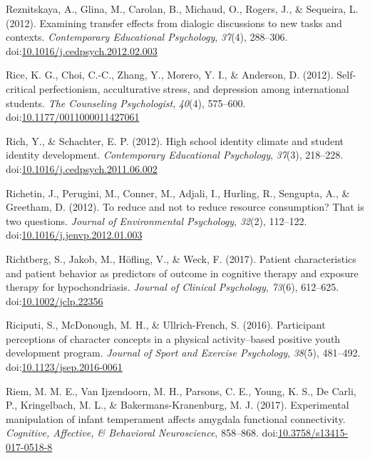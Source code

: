 \documentclass[english,man]{apa6}
\theoremstyle{definition}
\theoremstyle{definition}
\theoremstyle{definition}
\theoremstyle{remark}
\begin{document}
\hypertarget{ref-Reznitskaya2012}{}
Reznitskaya, A., Glina, M., Carolan, B., Michaud, O., Rogers, J., \&
Sequeira, L. (2012). Examining transfer effects from dialogic
discussions to new tasks and contexts. \emph{Contemporary Educational
Psychology}, \emph{37}(4), 288--306.
doi:\href{https://doi.org/10.1016/j.cedpsych.2012.02.003}{10.1016/j.cedpsych.2012.02.003}

\hypertarget{ref-Rice2012}{}
Rice, K. G., Choi, C.-C., Zhang, Y., Morero, Y. I., \& Anderson, D.
(2012). Self-critical perfectionism, acculturative stress, and
depression among international students. \emph{The Counseling
Psychologist}, \emph{40}(4), 575--600.
doi:\href{https://doi.org/10.1177/0011000011427061}{10.1177/0011000011427061}

\hypertarget{ref-Rich2012}{}
Rich, Y., \& Schachter, E. P. (2012). High school identity climate and
student identity development. \emph{Contemporary Educational
Psychology}, \emph{37}(3), 218--228.
doi:\href{https://doi.org/10.1016/j.cedpsych.2011.06.002}{10.1016/j.cedpsych.2011.06.002}

\hypertarget{ref-Richetin2012}{}
Richetin, J., Perugini, M., Conner, M., Adjali, I., Hurling, R.,
Sengupta, A., \& Greetham, D. (2012). To reduce and not to reduce
resource consumption? That is two questions. \emph{Journal of
Environmental Psychology}, \emph{32}(2), 112--122.
doi:\href{https://doi.org/10.1016/j.jenvp.2012.01.003}{10.1016/j.jenvp.2012.01.003}

\hypertarget{ref-Richtberg2017}{}
Richtberg, S., Jakob, M., Höfling, V., \& Weck, F. (2017). Patient
characteristics and patient behavior as predictors of outcome in
cognitive therapy and exposure therapy for hypochondriasis.
\emph{Journal of Clinical Psychology}, \emph{73}(6), 612--625.
doi:\href{https://doi.org/10.1002/jclp.22356}{10.1002/jclp.22356}

\hypertarget{ref-Riciputi2016}{}
Riciputi, S., McDonough, M. H., \& Ullrich-French, S. (2016).
Participant perceptions of character concepts in a physical
activity--based positive youth development program. \emph{Journal of
Sport and Exercise Psychology}, \emph{38}(5), 481--492.
doi:\href{https://doi.org/10.1123/jsep.2016-0061}{10.1123/jsep.2016-0061}

\hypertarget{ref-Riem2017}{}
Riem, M. M. E., Van Ijzendoorn, M. H., Parsons, C. E., Young, K. S., De
Carli, P., Kringelbach, M. L., \& Bakermans-Kranenburg, M. J. (2017).
Experimental manipulation of infant temperament affects amygdala
functional connectivity. \emph{Cognitive, Affective, \& Behavioral
Neuroscience}, 858--868.
doi:\href{https://doi.org/10.3758/s13415-017-0518-8}{10.3758/s13415-017-0518-8}
\end{document}
